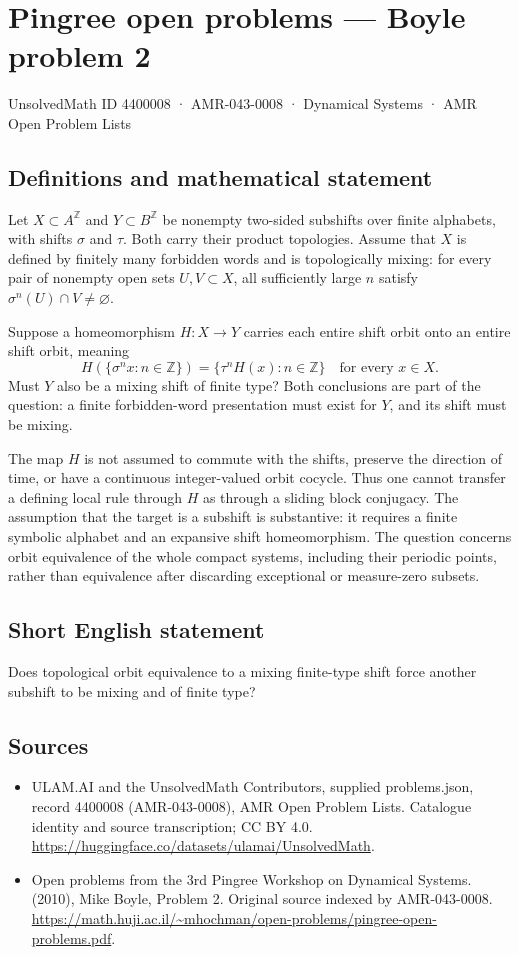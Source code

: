 \documentclass[11pt,a4paper]{article}
\begin{document}
\section*{Pingree open problems — Boyle problem 2}\label{4400008}
{\small UnsolvedMath ID 4400008 · AMR-043-0008 · Dynamical Systems · AMR Open Problem Lists}
\subsection{Definitions and mathematical statement}
Let $X\subset A^{\mathbb Z}$ and $Y\subset B^{\mathbb Z}$ be nonempty
two-sided subshifts over finite alphabets, with shifts $\sigma$ and $\tau$.
Both carry their product topologies. Assume that $X$ is defined by finitely
many forbidden words and is topologically mixing: for every pair of nonempty
open sets $U,V\subset X$, all sufficiently large $n$ satisfy
$\sigma^n(U)\cap V\ne\varnothing$.

Suppose a homeomorphism $H:X\to Y$ carries each entire shift orbit onto an
entire shift orbit, meaning
\[
 H(\{\sigma^n x:n\in\mathbb Z\})
       =\{\tau^n H(x):n\in\mathbb Z\}\quad\text{for every }x\in X.
\]
Must $Y$ also be a mixing shift of finite type? Both conclusions are part of
the question: a finite forbidden-word presentation must exist for $Y$, and
its shift must be mixing.

The map $H$ is not assumed to commute with the shifts, preserve the direction
of time, or have a continuous integer-valued orbit cocycle. Thus one cannot
transfer a defining local rule through $H$ as through a sliding block
conjugacy. The assumption that the target is a subshift is substantive: it
requires a finite symbolic alphabet and an expansive shift homeomorphism.
The question concerns orbit equivalence of the whole compact systems,
including their periodic points, rather than equivalence after discarding
exceptional or measure-zero subsets.
\subsection{Short English statement}
Does topological orbit equivalence to a mixing finite-type shift force another subshift to be mixing and of finite type?
\subsection{Sources}
\begin{itemize}
\item[S1] ULAM.AI and the UnsolvedMath Contributors, supplied problems.json, record 4400008 (AMR-043-0008), AMR Open Problem Lists. Catalogue identity and source transcription; CC BY 4.0.
\url{https://huggingface.co/datasets/ulamai/UnsolvedMath}.
\item[S2] Open problems from the 3rd Pingree Workshop on Dynamical Systems. (2010), Mike Boyle, Problem 2. Original source indexed by AMR-043-0008.
\url{https://math.huji.ac.il/~mhochman/open-problems/pingree-open-problems.pdf}.
\end{itemize}
\end{document}
